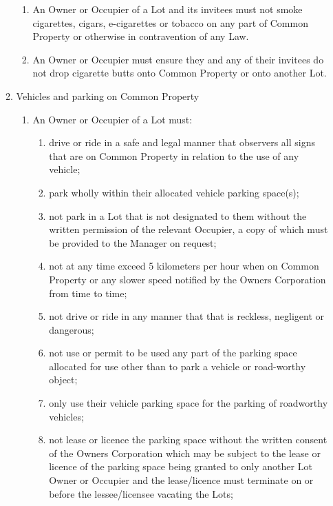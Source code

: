 \documentclass{article}
\begin{document}
\begin{enumerate}[label=\arabic*.]
\begin{enumerate}[label=\arabic{enumi}.\arabic*.]
\begin{enumerate}[label=(\arabic*)]
\item  An Owner or Occupier of a Lot and its invitees must not smoke cigarettes, cigars, e-cigarettes or tobacco on any part of Common Property or otherwise in contravention of any Law.

\item  An Owner or Occupier must ensure they and any of their invitees do not drop cigarette butts onto Common Property or onto another Lot.

\end{enumerate}

\item  Vehicles and parking on Common Property

\begin{enumerate}[label=(\arabic*)]

\item  An Owner or Occupier of a Lot must:

\begin{enumerate}[label=(\alph*)]

\item  drive or ride in a safe and legal manner that observers all signs that are on Common Property in relation to the use of any vehicle;

\item  park wholly within their allocated vehicle parking space(s);

\item  not park in a Lot that is not designated to them without the written permission of the relevant Occupier, a copy of which must be provided to the Manager on request;

\item  not at any time exceed 5 kilometers per hour when on Common Property or any slower speed notified by the Owners Corporation from time to time;

\item  not drive or ride in any manner that that is reckless, negligent or dangerous;

\item  not use or permit to be used any part of the parking space allocated for use other than to park a vehicle or road-worthy object;

\item  only use their vehicle parking space for the parking of roadworthy vehicles;

\item  not lease or licence the parking space without the written consent of the Owners Corporation which may be subject to the lease or licence of the parking space being granted to only another Lot Owner or Occupier and the lease/licence must terminate on or before the lessee/licensee vacating the Lots;


\end{enumerate}
\end{enumerate}
\end{enumerate}
\end{enumerate}
\end{document}
